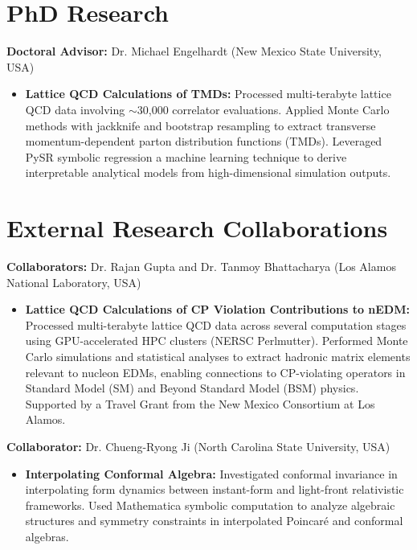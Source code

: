 \documentclass[11pt]{article}
\begin{document}
\section*{PhD Research}
\vspace{-0.3em}
\textbf{Doctoral Advisor:} Dr. Michael Engelhardt (New Mexico State University, USA)
\begin{itemize}
    \item \textbf{Lattice QCD Calculations of TMDs:} Processed multi-terabyte lattice QCD data involving $\sim$30,000 correlator evaluations. Applied Monte Carlo methods with jackknife and bootstrap resampling to extract transverse momentum-dependent parton distribution functions (TMDs). Leveraged PySR symbolic regression a machine learning technique to derive interpretable analytical models from high-dimensional simulation outputs.
\end{itemize}


\section*{External Research Collaborations}
\vspace{-0.3em}
\textbf{Collaborators:} Dr. Rajan Gupta and Dr. Tanmoy Bhattacharya (Los Alamos National Laboratory, USA)
\begin{itemize}
    \item \textbf{Lattice QCD Calculations of CP Violation Contributions to nEDM:} Processed multi-terabyte lattice QCD data across several computation stages using GPU-accelerated HPC clusters (NERSC Perlmutter). Performed Monte Carlo simulations and statistical analyses to extract hadronic matrix elements relevant to nucleon EDMs, enabling connections to CP-violating operators in Standard Model (SM) and Beyond Standard Model (BSM) physics. Supported by a Travel Grant from the New Mexico Consortium at Los Alamos.
\end{itemize}

\textbf{Collaborator:} Dr. Chueng-Ryong Ji (North Carolina State University, USA)
\begin{itemize}
    \item \textbf{Interpolating Conformal Algebra:} Investigated conformal invariance in interpolating form dynamics between instant-form and light-front relativistic frameworks. Used Mathematica symbolic computation to analyze algebraic structures and symmetry constraints in interpolated Poincaré and conformal algebras.
\end{itemize}
%
\end{document}
